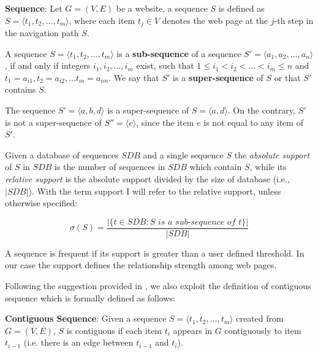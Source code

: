 \begin{definition}\label{def:sequence}\textbf{Sequence}:
Let $G = (V, E)$ be a website, a sequence $S$ is defined as $S=\langle t_1,t_2,\ldots,t_m \rangle$, where each item $t_j \in V$ denotes the web page at the $j$-th step in the navigation path $S$.
\end{definition}

A sequence $S=\langle t_1,t_2,\ldots,t_m \rangle$ is a \textbf{sub-sequence} of a sequence $S'=\langle a_1,a_2,\ldots,a_n \rangle$, if and only if integers $i_1, i_2, \dots, i_m$ exist, such that $1 \leq i_1 < i_2 < \dots < i_m \leq n$ and $t_1 = a_{i1}, t_2 = a_{i2}, \dots t_m = a_{im}$. We say that $S'$ is a \textbf{super-sequence} of $S$ or that $S'$ contains $S$.
\begin{example}
The sequence $S' = \langle a, b, d \rangle$ is a super-sequence of $S = \langle a,d \rangle $. On the contrary, $S'$ is not a super-sequence of $S'' = \langle e \rangle $, since the item $e$ is not equal to any item of $S'$.
\end{example}
Given a database of sequences $SDB$ and a single sequence $S$ the \emph{absolute support} of $S$ in $SDB$ is the number of sequences in $SDB$ which contain $S$, while its \emph{relative support} is the absolute support divided by the size of database (i.e., $|SDB|$).
With the term support I will refer to the relative support, unless otherwise specified:

\begin{equation}
\sigma(S) = \frac{|\{t \in SDB: S \textit{ is a  sub-sequence of } t\}|}{|SDB|}
\end{equation}

\noindent
A sequence is frequent if its support is greater than a user defined threshold. In our case the support defines the relationship strength among web pages.


Following the suggestion provided in \cite{Mobasher:2007}, we also exploit the definition of contiguous sequence which is formally defined as follows:

\begin{definition}\label{def:contiguousSeq}\textbf{Contiguous Sequence}: Given a sequence $S=\langle t_1,t_2,\ldots,t_m \rangle$ created from $G=(V,E)$, $S$ is contiguous if each item $t_i$ appears in $G$ contiguously to item $t_{i-1}$ (i.e. there is an edge between $t_{i-1}$ and $t_{i}$). 
\end{definition}



